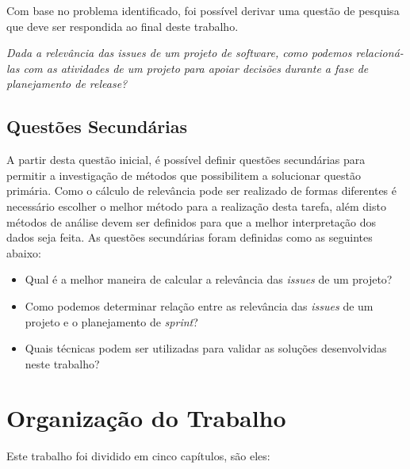 Com base no problema identificado, foi possível derivar uma questão de pesquisa que deve ser respondida ao final deste trabalho.

\begin{center}
    \textit{Dada a relevância das \textit{issues} de um projeto de software, como podemos relacioná-las com as atividades de um projeto para apoiar decisões durante a fase de planejamento de \textit{release}?}
\end{center}

\subsection{Questões Secundárias}
\label{int:que:sec}

A partir desta questão inicial, é possível definir questões secundárias para permitir a investigação de métodos que possibilitem a solucionar questão primária. Como o cálculo de relevância pode ser realizado de formas diferentes é necessário escolher o melhor método para a realização desta tarefa, além disto métodos de análise devem ser definidos para que a melhor interpretação dos dados seja feita. As questões secundárias foram definidas como as seguintes abaixo:

\begin{itemize}
    \item Qual é a melhor maneira de calcular a relevância das \textit{issues} de um projeto?
    \item Como podemos determinar relação entre as relevância das \textit{issues} de um projeto e o planejamento de \textit{sprint}?
    \item Quais técnicas podem ser utilizadas para validar as soluções desenvolvidas neste trabalho?
\end{itemize}


\section{Organização do Trabalho}
\label{int:org}
Este trabalho foi dividido em cinco capítulos, são eles:

